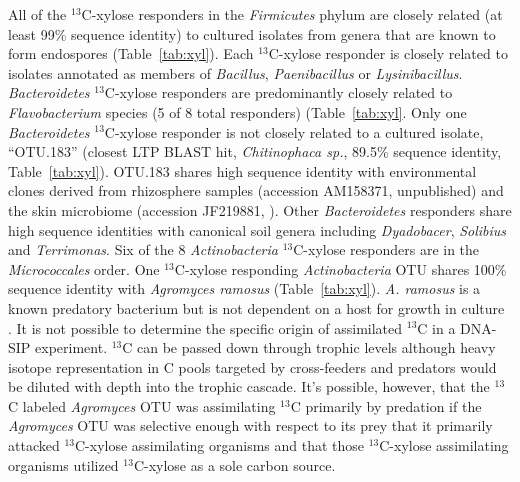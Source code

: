 All of the $^{13}$C-xylose responders in the \textit{Firmicutes} phylum are
closely related (at least 99\% sequence identity) to cultured isolates from
genera that are known to form endospores (Table~\ref{tab:xyl}). Each
$^{13}$C-xylose responder is closely related to isolates annotated as members
of \textit{Bacillus}, \textit{Paenibacillus} or \textit{Lysinibacillus}.
\textit{Bacteroidetes} $^{13}$C-xylose responders are predominantly closely
related to \textit{Flavobacterium} species (5 of 8 total responders)
(Table~\ref{tab:xyl}.  Only one \textit{Bacteroidetes} $^{13}$C-xylose
responder is not closely related to a cultured isolate, ``OTU.183'' (closest
LTP BLAST hit, \textit{Chitinophaca sp.}, 89.5\% sequence identity,
Table~\ref{tab:xyl}). OTU.183 shares high sequence identity with environmental
clones derived from rhizosphere samples (accession AM158371, unpublished) and
the skin microbiome (accession JF219881, \citet{Kong_2012}). Other
\textit{Bacteroidetes} responders share high sequence identities with canonical
soil genera including \textit{Dyadobacer}, \textit{Solibius} and
\textit{Terrimonas}. Six of the 8 \textit{Actinobacteria} $^{13}$C-xylose
responders are in the \textit{Micrococcales} order. One $^{13}$C-xylose
responding \textit{Actinobacteria} OTU shares 100\% sequence identity with
\textit{Agromyces ramosus} (Table~\ref{tab:xyl}).  \textit{A. ramosus} is a
known predatory bacterium but is not dependent on a host for growth in culture
\citep{16346402}. It is not possible to determine the specific origin of
assimilated $^{13}$C in a DNA-SIP experiment. $^{13}$C can be passed down
through trophic levels although heavy isotope representation in C pools
targeted by cross-feeders and predators would be diluted with depth into the
trophic cascade.  It's possible, however, that the $^{13}$C labeled
\textit{Agromyces} OTU was assimilating $^{13}$C primarily by predation if the
\textit{Agromyces} OTU was selective enough with respect to its prey that it
primarily attacked $^{13}$C-xylose assimilating organisms and that those
$^{13}$C-xylose assimilating organisms utilized $^{13}$C-xylose as a sole
carbon source.

